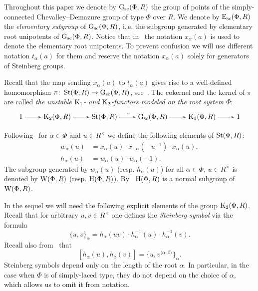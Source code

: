 Throughout this paper we denote by $\operatorname{G}_\mathrm{sc}(\Phi, R)$ the group of points of the simply-connected Chevalley--Demazure group of type $\Phi$ over $R$.
We denote by $\operatorname{E}_\mathrm{sc}(\Phi, R)$ the \textit{elementary subgroup} of $\operatorname{G}_\mathrm{sc}(\Phi, R)$, i.\,e. the subgroup generated by elementary root unipotents of $\operatorname{G}_\mathrm{sc}(\Phi, R)$.
Notice that in~\cite{VP, Vav09} the notation $x_\alpha(a)$ is used to denote the elementary root unipotents.
To prevent confusion we will use different notation $t_\alpha(a)$ for them and reserve the notation $x_\alpha(a)$ solely for generators of Steinberg groups.

Recall that the map sending $x_\alpha(a)$ to $t_\alpha(a)$ gives rise to a well-defined homomorphism $\pi \colon \operatorname{St}(\Phi, R) \to \operatorname{G}_\mathrm{sc}(\Phi, R)$, see~\cite[\S~1A]{St78}.
The cokernel and the kernel of $\pi$ are called \textit{the unstable $\operatorname{K}_1$- and $\operatorname{K}_2$-functors modeled on the root system $\Phi$}:
\begin{equation} \label{eq:K1-K2-sequence}
  \xymatrix{ 1 \ar[r] & \K_2(\Phi, R) \ar[r] & \St(\Phi, R) \ar[r]^{\pi} & \Gsc(\Phi, R) \ar[r] & \K_1(\Phi, R) \ar[r] & 1}
\end{equation}

Following~\cite{Ma69} for $\alpha\in\Phi$ and $u \in R^\times$ we define the following elements of $\operatorname{St}(\Phi, R)$:
\begin{align*} w_\alpha(u) & =  x_\alpha(u) \cdot x_{-\alpha}(-u^{-1}) \cdot x_\alpha(u), \\
               h_\alpha(u) & =  w_\alpha(u) \cdot w_\alpha(-1).  \end{align*}
The subgroup generated by $w_\alpha(u)$ (resp. $h_\alpha(u)$) for all $\alpha\in \Phi$, $u \in R^\times$ is denoted by $\operatorname{W}(\Phi, R)$ (resp. $\operatorname{H}(\Phi, R)$).
By~\cite[Lemme~5.2]{Ma69} $\operatorname{H}(\Phi, R)$ is a normal subgroup of $\operatorname{W}(\Phi, R)$.

In the sequel we will need the following explicit elements of the group $\operatorname{K}_2(\Phi, R)$.
Recall that for arbitrary $u, v \in R^\times$ one defines the \textit{Steinberg symbol} via the formula
\begin{equation} \label{eq:steinberg} \{ u, v \}_\alpha = h_\alpha(uv) \cdot h_\alpha^{-1}(u) \cdot h_\alpha^{-1}(v). \end{equation}
Recall also from~\cite[Lemme~5.4]{Ma69} that
\begin{equation} \label{eq:steinberg-2} [h_\alpha(u), h_\beta(v)] = \{u, v^{\langle \alpha, \beta \rangle}\}_\alpha. \end{equation}
Steinberg symbols depend only on the length of the root $\alpha$.
In particular, in the case when $\Phi$ is of simply-laced type, they do not depend on the choice of $\alpha$, which allows us to omit it from notation.

